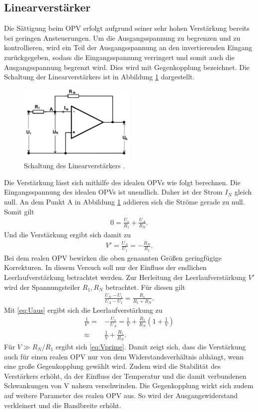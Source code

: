  \subsection{Linearverstärker}
 Die Sättigung beim OPV erfolgt aufgrund seiner sehr hohen Verstärkung bereits bei geringen Ansteuerungen. 
 Um die Ausgangsspannung 
 zu begrenzen und zu kontrollieren,
wird ein Teil der Ausgangsspannung an den invertierenden Eingang zurückgegeben, sodass
die Eingangsspannung verringert und somit
auch die Ausgangsspannung begrenzt wird.
Dies wird mit Gegenkopplung bezeichnet. Die
Schaltung der Linearverstärkers ist in Abbildung \ref{pic:linear}
dargestellt. 
\begin{figure}[t]
 \includegraphics[width = 0.5\textwidth]{../pics/Linear.png}
 \caption{Schaltung des Linearverstärkers \cite{Anl}.}
 \label{pic:linear}
\end{figure}
Die Verstärkung lässt sich mithilfe
des idealen OPVs wie folgt berechnen. Die Eingangsspannung des idealen OPVs ist
unendlich. Daher ist der Strom $I_N$ gleich null. An dem Punkt A in Abbildung \ref{pic:linear}
addieren sich die Ströme gerade zu null. Somit gilt
\begin{align}
 0 = \frac{U_1}{R_1} + \frac{U_A}{R_N}.
\end{align}
Und die Verstärkung ergibt sich damit zu
\begin{align}
 V' = \frac{U_A}{U_1} = -\frac{R_N}{R_1}.
 \label{eq:Vprime}
\end{align}
Bei dem realen OPV bewirken die oben genannten Größen geringfügige Korrekturen.
In diesem Versuch soll nur der Einfluss der endlichen Leerlaufverstärkung betrachtet werden.
Zur Herleitung der Leerlaufverstärkung $V'$ wird der Spannungsteiler $R_1,R_N$ betrachtet.
Für diesen gilt
\begin{align}
 \frac{U_N-U_1}{U_A-U_1} = \frac{R_1}{R_1+R_N}.
\end{align}
Mit \eqref{eq:Uaus} ergibt sich die Leerlaufverstärkung zu
\begin{align}
 \frac{1}{V'} =& -\frac{U_1}{U_A} = \frac{1}{V} + \frac{R_1}{R_N}\left(1+\frac{1}{V}\right) \\
 \approx& \frac{1}{V} + \frac{R_1}{R_N}.
 \label{eq:leerlauf}
\end{align}
Für $V\gg R_N/R_1$ ergibt sich \eqref{eq:Vprime}. 
Damit zeigt sich, dass die Verstärkung 
auch für einen realen OPV nur von
dem Widerstandsverhältnis abhängt, wenn eine 
große Gegenkopplung gewählt wird. Zudem 
wird die Stabilität des Verstärkers erhöht,
da der Einfluss der Temperatur und die damit 
verbundenen Schwankungen von V nahezu
verschwinden. Die Gegenkopplung wirkt sich
zudem auf weitere Parameter des realen OPV
aus. So wird der Ausgangswiderstand verkleinert 
und die Bandbreite erhöht.

